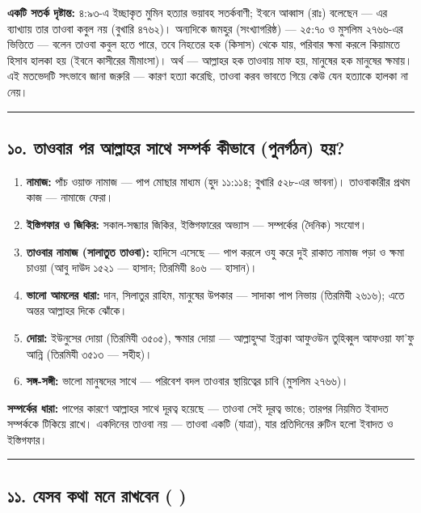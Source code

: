 \textbf{একটি সতর্ক দৃষ্টান্ত:} ৪:৯৩-এ ইচ্ছাকৃত মুমিন হত্যার ভয়াবহ সতর্কবাণী; ইবনে আব্বাস (রাঃ) বলেছেন — এর ব্যাখ্যায় তার তাওবা কবুল নয় (বুখারি ৪৭৬২)। অন্যদিকে জমহুর (সংখ্যাগরিষ্ঠ) — ২৫:৭০ ও মুসলিম ২৭৬৬-এর ভিত্তিতে — বলেন তাওবা কবুল হতে পারে, তবে নিহতের হক (কিসাস) থেকে যায়, পরিবার ক্ষমা করলে কিয়ামতে হিসাব হালকা হয় (ইবনে কাসীরের মীমাংসা)। অর্থ — আল্লাহর হক তাওবায় মাফ হয়, মানুষের হক মানুষের ক্ষমায়। এই মতভেদটি সৎভাবে জানা জরুরি — কারণ হত্যা করেছি, তাওবা করব ভাবতে গিয়ে কেউ যেন হত্যাকে হালকা না নেয়।

\medskip\hrule\medskip

\subsection*{১০. তাওবার পর আল্লাহর সাথে সম্পর্ক কীভাবে  (পুনর্গঠন) হয়?}

\begin{enumerate}
\item \textbf{নামাজ:} পাঁচ ওয়াক্ত নামাজ — পাপ মোছার মাধ্যম (হুদ ১১:১১৪; বুখারি ৫২৮-এর ভাবনা)। তাওবাকারীর প্রথম কাজ — নামাজে ফেরা।
\item \textbf{ইস্তিগফার ও জিকির:} সকাল-সন্ধ্যার জিকির, ইস্তিগফারের অভ্যাস — সম্পর্কের  (দৈনিক) সংযোগ।
\item \textbf{তাওবার নামাজ (সালাতুত তাওবা):} হাদিসে এসেছে — পাপ করলে ওযু করে দুই রাকাত নামাজ পড়া ও ক্ষমা চাওয়া (আবু দাউদ ১৫২১ — হাসান; তিরমিযী ৪০৬ — হাসান)।
\item \textbf{ভালো আমলের ধারা:} দান, সিলাতুর রাহিম, মানুষের উপকার — সাদাকা পাপ নিভায় (তিরমিযী ২৬১৬); এতে অন্তর আল্লাহর দিকে ঝোঁকে।
\item \textbf{দোয়া:} ইউনুসের দোয়া (তিরমিযী ৩৫০৫), ক্ষমার দোয়া — আল্লাহুম্মা ইন্নাকা আফুওউন তুহিব্বুল আফওয়া ফা'ফু আন্নি (তিরমিযী ৩৫১৩ — সহীহ)।
\item \textbf{সঙ্গ-সঙ্গী:} ভালো মানুষদের সাথে — পরিবেশ বদল তাওবার স্থায়িত্বের চাবি (মুসলিম ২৭৬৬)।
\end{enumerate}
\textbf{সম্পর্কের ধারা:} পাপের কারণে আল্লাহর সাথে দূরত্ব হয়েছে — তাওবা সেই দূরত্ব ভাঙে; তারপর নিয়মিত ইবাদত সম্পর্ককে টিকিয়ে রাখে। একদিনের তাওবা নয় — তাওবা একটি  (যাত্রা), যার প্রতিদিনের রুটিন হলো ইবাদত ও ইস্তিগফার।

\medskip\hrule\medskip

\subsection*{১১. যেসব কথা মনে রাখবেন ( )}

